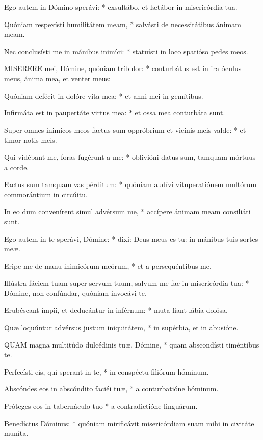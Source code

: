 Ego autem in Dómino sperávi: * exsultábo, et lætábor in misericórdia tua.

Quóniam respexísti humilitátem meam, * salvásti de necessitátibus ánimam meam.

Nec conclusísti me in mánibus inimíci: * statuísti in loco spatióso pedes meos.


\lettrine[lines=2]{M}{ISERERE} mei, Dómine, quóniam tríbulor: * conturbátus est in ira óculus meus, ánima mea, et venter meus:

Quóniam defécit in dolóre vita mea: * et anni mei in gemítibus.

Infirmáta est in paupertáte virtus mea: * et ossa mea conturbáta sunt.

Super omnes inimícos meos factus sum oppróbrium et vicínis meis valde: * et timor notis meis.

Qui vidébant me, foras fugérunt a me: * oblivióni datus sum, tamquam mórtuus a corde.

Factus sum tamquam vas pérditum: * quóniam audívi vituperatiónem multórum commorántium in circúitu.

In eo dum convenírent simul advérsum me, * accípere ánimam meam consiliáti sunt.

Ego autem in te sperávi, Dómine: * dixi: Deus meus es tu: in mánibus tuis sortes meæ.

Eripe me de manu inimicórum meórum, * et a persequéntibus me.

Illústra fáciem tuam super servum tuum, salvum me fac in misericórdia tua: * Dómine, non confúndar, quóniam invocávi te.

Erubéscant ímpii, et deducántur in inférnum: * muta fiant lábia dolósa.

Quæ loquúntur advérsus justum iniquitátem, * in supérbia, et in abusióne.


\lettrine[lines=2]{Q}{UAM} magna multitúdo dulcédinis tuæ, Dómine, * quam abscondísti timéntibus te.

Perfecísti eis, qui sperant in te, * in conspéctu filiórum hóminum.

Abscóndes eos in abscóndito faciéi tuæ, * a conturbatióne hóminum.

Próteges eos in tabernáculo tuo * a contradictióne linguárum.

Benedíctus Dóminus: * quóniam mirificávit misericórdiam suam mihi in civitáte muníta.

